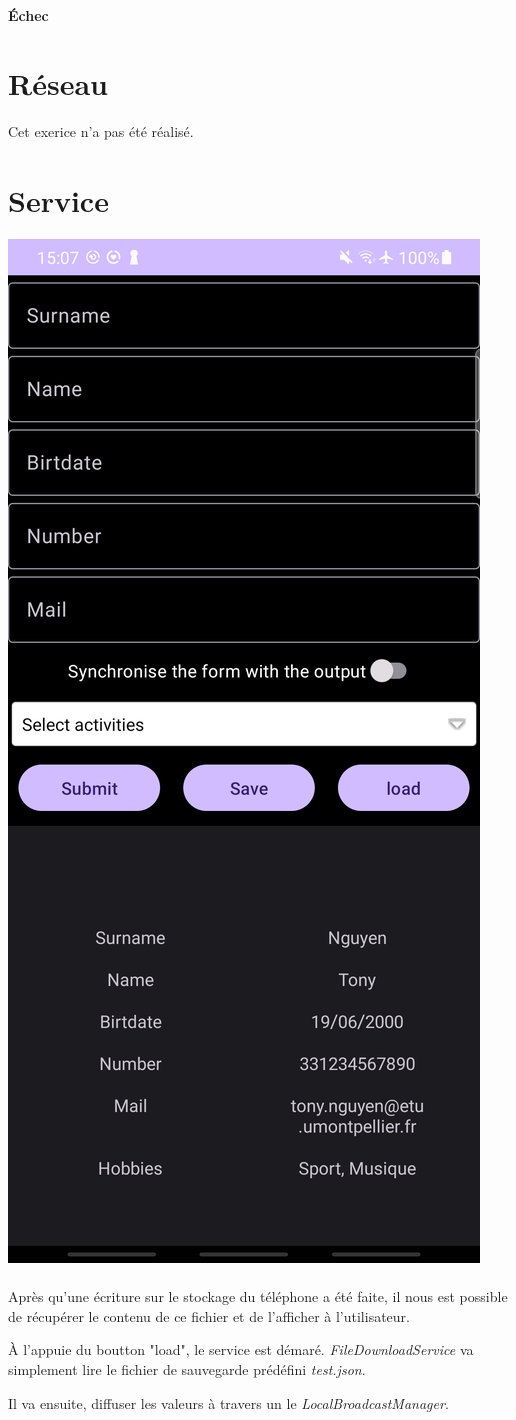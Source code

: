 \documentclass[a4paper]{article}
\begin{document}
\begin{multicols}{2}
                \paragraph{Échec}
        \section{Réseau}
            Cet exerice n'a pas été réalisé.
        \section{Service}
            \noindent\includegraphics[width=.47\textwidth]{load/loaded}
            \paragraph{}
                Après qu'une écriture sur le stockage du téléphone a été faite, il nous est possible de récupérer le contenu de ce fichier et de l'afficher à l'utilisateur.

                À l'appuie du boutton "load", le service est démaré. \emph{FileDownloadService} va simplement lire le fichier de sauvegarde prédéfini \emph{test.json}.

                Il va ensuite, diffuser les valeurs à travers un le \emph{LocalBroadcastManager}.

\end{multicols}
\end{document}
